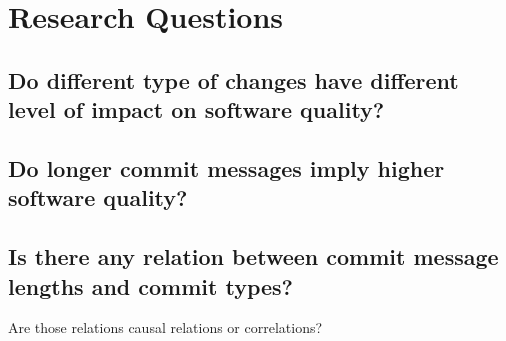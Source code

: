 \section{Research Questions}

\subsection{Do different type of changes have different level of impact on software quality?}

\subsection{Do longer commit messages imply higher software quality?}

\subsection{Is there any relation between commit message lengths and commit types?}

Are those relations causal relations or correlations?